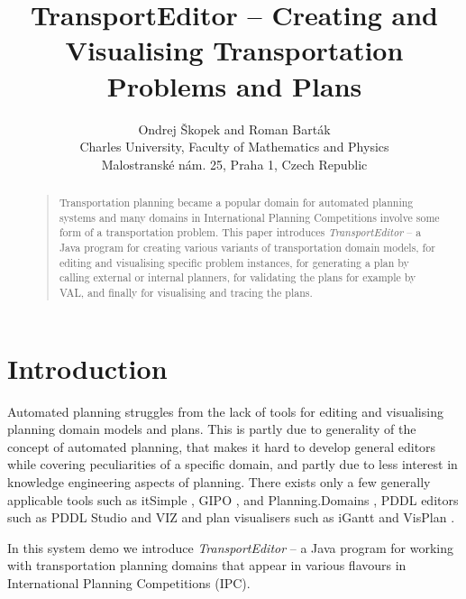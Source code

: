 \documentclass[letterpaper]{article}
\begin{document}
\title{TransportEditor -- Creating and Visualising Transportation Problems and Plans}

 \author{Ondrej \v{S}kopek and Roman Bart\'{a}k \\
 Charles University, Faculty of Mathematics and Physics \\
 Malostransk\'{e} n\'{a}m. 25, Praha 1, Czech Republic}


\maketitle

\begin{abstract}
\begin{quote}
Transportation planning became a popular domain for automated planning systems and many domains in International Planning Competitions involve some form of a transportation problem. This paper introduces \emph{TransportEditor} -- a Java program for creating various variants of transportation domain models, for editing and visualising specific problem instances, for generating a plan by calling external or internal planners, for validating the plans for example by VAL, and finally for visualising and tracing the plans.
\end{quote}
\end{abstract}

\section{Introduction}
Automated planning struggles from the lack of tools for editing and visualising planning domain models and plans. This is partly due to generality of the concept of automated planning, that makes it hard to develop general editors while covering peculiarities of a specific domain, and partly due to less interest in knowledge engineering aspects of planning. There exists only a few generally applicable tools such as itSimple \cite{itsimple}, GIPO \cite{gipo}, and Planning.Domains \cite{pd}, PDDL editors such as PDDL Studio \cite{studio} and VIZ \cite{viz} and plan visualisers such as iGantt \cite{igantt} and VisPlan \cite{visplan}.

In this system demo we introduce \emph{TransportEditor} --  a Java program for working with transportation planning domains that appear in various flavours in International Planning Competitions (IPC).
\end{document}
